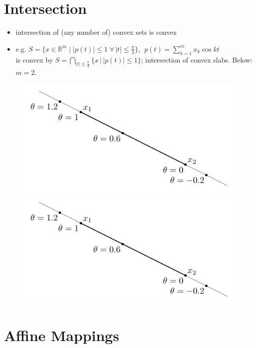 \documentclass[11pt]{extarticle}
\newcommand{\ds}{\displaystyle}
\theoremstyle{definition}
\begin{document}
\section*{Intersection}
\begin{itemize}
  \item intersection of (any number of) convex sets is convex
  \item e.g. $\ds S = \Big\{x\in\mathbb{R}^m\;\Big|\;|p(t)|\leqslant 1\;\forall\,|t|\leqslant\frac{\pi}{3}\Big\}$, $\ds\;p(t) = \sum_{k = 1}^m x_k\cos kt$\\is convex by $\ds S = \bigcap_{|t|\leqslant\frac{\pi}{3}}\{x\,|\,|p(t)|\leqslant 1\}$; intersection of convex slabs. Below: $m = 2$. 
\end{itemize}
\vspace{-1em}
\begin{figure}[!htbp]
  \centering
  \includegraphics[scale=0.65,page=13]{fig/02.pdf}
  \hspace{1em}
  \includegraphics[scale=0.6,page=14]{fig/02.pdf}
\end{figure}

\newpage

\section*{Affine Mappings}
\end{document}
